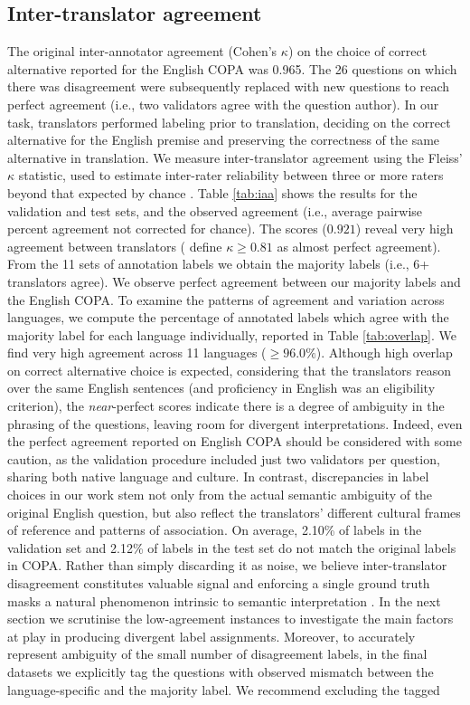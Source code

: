 \documentclass[11pt,a4paper]{article}
\begin{document}
\subsection{Inter-translator agreement}
The original inter-annotator agreement (Cohen's $\kappa$) on the choice of correct alternative reported for the English COPA \cite{Roemmele:2011aaai} was 0.965. The 26 questions on which there was disagreement were subsequently replaced with new questions to reach perfect agreement (i.e., two validators agree with the question author). In our task, translators performed labeling prior to translation, deciding on the correct alternative for the English premise and preserving the correctness of the same alternative in translation. We measure inter-translator agreement using the Fleiss' $\kappa$ statistic, used to estimate inter-rater reliability between three or more raters beyond that expected by chance \cite{fleiss1971measuring}. Table \ref{tab:iaa} shows the results for the validation and test sets, and the observed agreement (i.e., average pairwise percent agreement not corrected for chance). The scores ($0.921$) reveal very high agreement between translators (\citet{landis1977measurement} define $\kappa\geq0.81$ as almost perfect agreement). From the 11 sets of annotation labels we obtain the majority labels (i.e., 6+ translators agree). We observe perfect agreement between our majority labels and the English COPA. To examine the patterns of agreement and variation across languages, we compute the percentage of annotated labels which agree with the majority label for each language individually, reported in Table \ref{tab:overlap}. We find very high agreement across 11 languages ($\geq96.0\%$). Although high overlap on correct alternative choice is expected, considering that the translators reason over the same English sentences (and proficiency in English was an eligibility criterion), the \emph{near}-perfect scores indicate there is a degree of ambiguity in the phrasing of the questions, leaving room for divergent interpretations. Indeed, even the perfect agreement reported on English COPA should be considered with some caution, as the validation procedure included just two validators per question, sharing both native language and culture. In contrast, discrepancies in label choices in our work stem not only from the actual semantic ambiguity of the original English question, but also reflect the translators' different cultural frames of reference and patterns of association. On average, 2.10\% of labels in the validation set and 2.12\% of labels in the test set do not match the original labels in COPA. Rather than simply discarding it as noise, we believe inter-translator disagreement constitutes valuable signal and enforcing a single ground truth masks a natural phenomenon intrinsic to semantic interpretation \cite{aroyo2015truth}. In the next section we scrutinise the low-agreement instances to investigate the main factors at play in producing divergent label assignments. Moreover, to accurately represent ambiguity of the small number of disagreement labels, in the final datasets we explicitly tag the questions with observed mismatch between the language-specific and the majority label. We recommend excluding the tagged 
\end{document}
